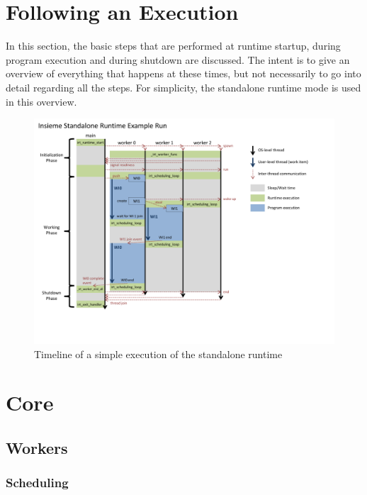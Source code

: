 \section{Following an Execution}
In this section, the basic steps that are performed at runtime startup, during program execution and during shutdown are discussed. The intent is to give an overview of everything that happens at these times, but not necessarily to go into detail regarding all the steps. For simplicity, the standalone runtime mode is used in this overview.

\begin{figure}[tb]
	\centering
	\includegraphics[width=\textwidth, trim=2cm 2cm 4cm 2cm]{pics/runtime/standalone_runtime_run.pdf}
	\caption{Timeline of a simple execution of the standalone runtime}
	\label{fig:runtime:execution}
\end{figure}


\section{Core}
\subsection{Workers}
\subsubsection{Scheduling}
